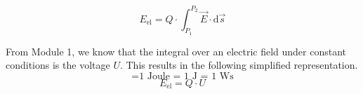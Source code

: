 {\begin{equation}
	E_\mathrm{el} = Q \cdot \int_{P_\mathrm{1}}^{P_\mathrm{2}} \vec{E} \cdot \mathrm{d}\vec{s}
\end{equation}

From Module 1, we know that the integral over an electric field under constant conditions is the voltage $U$.
This results in the following simplified representation.
\newpage
\begin{equation*}
	[E_\mathrm{el}] = \text{1 Joule = 1 J = 1 Ws} 
\end{equation*}
\vspace{0.1cm}
\begin{equation}
    E_\mathrm{el} = Q \cdot U
\end{equation}

}%


